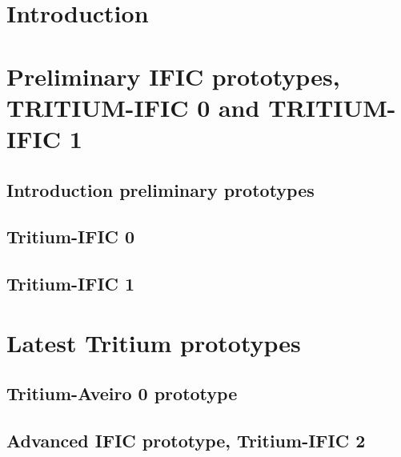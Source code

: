 \documentclass[12pt,a4paper]{book}
\begin{document}
	\section{Introduction}\label{sec:IntroPrototypes}
	
	\newpage
	
	\section[Preliminary prototypes]{Preliminary IFIC prototypes, TRITIUM-IFIC 0 and TRITIUM-IFIC 1}\label{sec:Preliminary_prototypes}
		
		\subsection{Introduction preliminary prototypes}\label{subsec:IntroPreliminaryPrototypes}
		
		
		\subsection{Tritium-IFIC 0}\label{subsec:TritiumIFIC0}
		
		
		\subsection{Tritium-IFIC 1}\label{subsec:TritiumIFIC1}
		
		\newpage
				
	\section{Latest Tritium prototypes}\label{sec:LatestTritiumPrototypes}
	
	
		\subsection{Tritium-Aveiro 0 prototype}\label{subsec:TritiumAveiro}
		
		
		\subsection[Tritium-IFIC 2]{Advanced IFIC prototype, Tritium-IFIC 2}\label{subsec:TritiumIFIC2}
		
		\newpage
		
\end{document}
